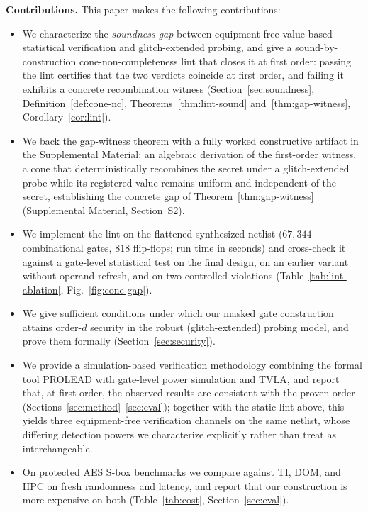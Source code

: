 \documentclass[lettersize,journal]{IEEEtran}
\begin{document}
\textbf{Contributions.} This paper makes the following contributions:
\begin{itemize}
  \item We characterize the \emph{soundness gap} between equipment-free
        value-based statistical verification and glitch-extended probing,
        and give a sound-by-construction cone-non-completeness lint that
        closes it at first order: passing the lint certifies that the two verdicts
        coincide at first order, and failing it exhibits a concrete recombination witness
        (Section~\ref{sec:soundness}, Definition~\ref{def:cone-nc},
        Theorems~\ref{thm:lint-sound} and~\ref{thm:gap-witness},
        Corollary~\ref{cor:lint}).
  \item We back the gap-witness theorem with a fully worked constructive
        artifact in the Supplemental Material: an algebraic derivation of the
        first-order witness, a cone that deterministically recombines the
        secret under a glitch-extended probe while its registered value
        remains uniform and independent of the secret, establishing the
        concrete gap of
        Theorem~\ref{thm:gap-witness} (Supplemental Material, Section~S2).
  \item We implement the lint on the flattened synthesized netlist
        ($67{,}344$ combinational gates, $818$ flip-flops; run time in
        seconds) and cross-check it against a gate-level statistical test
        on the final design, on an earlier variant without operand refresh,
        and on two controlled violations
        (Table~\ref{tab:lint-ablation}, Fig.~\ref{fig:cone-gap}).
  \item We give sufficient conditions under which our masked gate construction
        attains order-$d$ security in the robust (glitch-extended) probing
        model, and prove them formally (Section~\ref{sec:security}).
  \item We provide a simulation-based verification methodology combining the
        formal tool PROLEAD with gate-level power simulation and TVLA, and
        report that, at first order, the observed results are consistent with
        the proven order (Sections~\ref{sec:method}--\ref{sec:eval}); together with
        the static lint above, this yields three equipment-free
        verification channels on the same netlist, whose differing
        detection powers we characterize explicitly rather than treat as
        interchangeable.
  \item On protected AES S-box benchmarks we compare against TI, DOM, and
        HPC on fresh randomness and latency, and report that our construction
        is more expensive on both
        (Table~\ref{tab:cost}, Section~\ref{sec:eval}).
\end{itemize}
\end{document}
